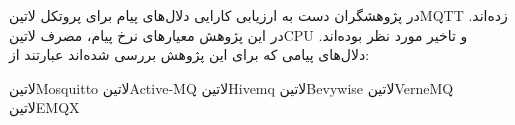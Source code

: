 



در  پژوهشگران دست به ارزیابی کارایی دلال‌های پیام برای پروتکل ‌لاتین{MQTT} زده‌اند. در این پژوهش معیارهای نرخ پیام، مصرف ‌لاتین{CPU} و تاخیر مورد نظر بوده‌اند.
دلال‌های پیامی که برای این پژوهش بررسی شده‌اند عبارتند از:


 ‌لاتین{Mosquitto}
 ‌لاتین{Active-MQ}
 ‌لاتین{Hivemq}
 ‌لاتین{Bevywise}
 ‌لاتین{VerneMQ}
 ‌لاتین{EMQX}

